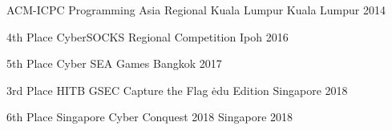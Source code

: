 



\begin{cvhonors}

  \cvhonor
    {}
    {ACM-ICPC Programming Asia Regional Kuala Lumpur} 
    {Kuala Lumpur} 
    {2014} 

  \cvhonor
    {4th Place} 
    {CyberSOCKS Regional Competition} 
    {Ipoh} 
    {2016} 

  \cvhonor
    {5th Place} 
    {Cyber SEA Games} 
    {Bangkok} 
    {2017} 

  \cvhonor
    {3rd Place} 
    {HITB GSEC Capture the Flag \.edu Edition} 
    {Singapore} 
    {2018} 

  \cvhonor
    {6th Place} 
    {Singapore Cyber Conquest 2018} 
    {Singapore} 
    {2018} 

\end{cvhonors}




